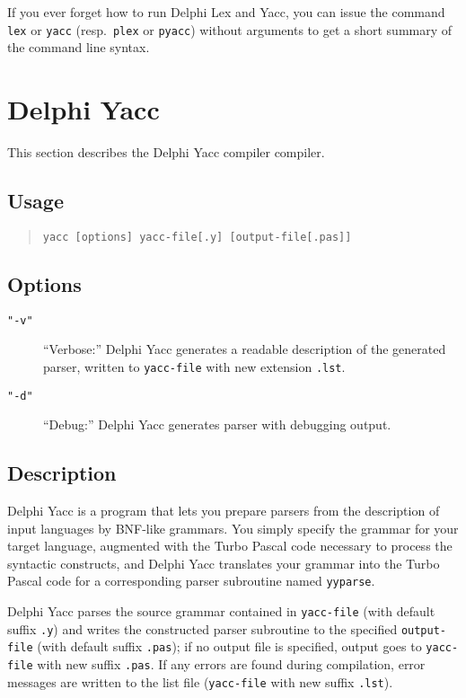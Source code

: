 \documentclass{article}
\begin{document}
If you ever forget how to run Delphi Lex and Yacc, you can issue the command
\verb"lex" or \verb"yacc" (resp.\ \verb"plex" or \verb"pyacc")
without arguments to get a short summary of the command line syntax.

\newpage

\section{Delphi Yacc}

This section describes the Delphi Yacc compiler compiler.

\subsection{Usage}

\begin{quote}\begin{verbatim}
yacc [options] yacc-file[.y] [output-file[.pas]]
\end{verbatim}\end{quote}

\subsection{Options}

\begin{description}
   \item[\tt"-v"]
      ``Verbose:'' Delphi Yacc generates a readable description of the generated
      parser, written to \verb"yacc-file" with new extension \verb".lst".
   \item[\tt"-d"]
      ``Debug:'' Delphi Yacc generates parser with debugging output.
\end{description}

\subsection{Description}

Delphi Yacc is a program that lets you prepare parsers from the description
of input languages by BNF-like grammars. You simply specify the grammar
for your target language, augmented with the Turbo Pascal code necessary
to process the syntactic constructs, and Delphi Yacc translates your grammar
into the Turbo Pascal code for a corresponding parser subroutine named
\verb"yyparse".

Delphi Yacc parses the source grammar contained in \verb"yacc-file" (with default
suffix \verb".y") and writes the constructed parser subroutine to the
specified \verb"output-file" (with default suffix \verb".pas"); if no output
file is specified, output goes to \verb"yacc-file" with new suffix
\verb".pas". If any errors are found during compilation, error messages are
written to the list file (\verb"yacc-file" with new suffix \verb".lst").
\end{document}
